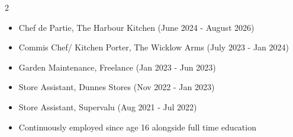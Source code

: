 \documentclass[10pt,a4paper,withhyper]{altacv}
\begin{document}
\begin{paracol}{2}
\medskip

\begin{itemize}
    \item Chef de Partie, The Harbour Kitchen (June 2024 - August 2026)
    \item Commis Chef/ Kitchen Porter, The Wicklow Arms (July 2023 - Jan 2024)
    \item Garden Maintenance, Freelance (Jan 2023 - Jun 2023)
    \item Store Assistant, Dunnes Stores (Nov 2022 - Jan 2023)
    \item Store Assistant, Supervalu (Aug 2021 - Jul 2022)
\divider
    \item Continuously employed since age 16 alongside full time education
\end{itemize}




\switchcolumn



\\
\\

\divider\smallskip

\\
\\






\smallskip


\end{paracol}
\end{document}
